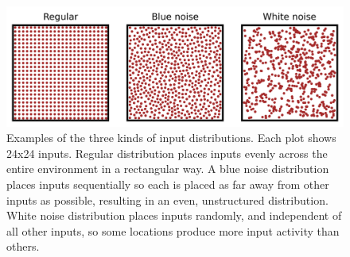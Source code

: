 \documentclass{article}
\begin{document}
    \begin{figure}[H]
        \centering
        \includegraphics[width=15cm]{distribution_plot.png}
        \caption{Examples of the three kinds of input distributions. Each plot shows 24x24 inputs. Regular distribution places inputs evenly across the entire environment in a rectangular way. A blue noise distribution places inputs sequentially so each is placed as far away from other inputs as possible, resulting in an even, unstructured distribution. White noise distribution places inputs randomly, and independent of all other inputs, so some locations produce more input activity than others.}
        \label{distribution_plot}
    \end{figure}


    \printbibliography
\end{document}
